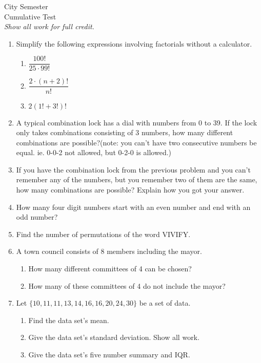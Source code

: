 \documentclass[12pt]{article}
\theoremstyle{plain}     %
\begin{document}
\large
City Semester\\
Cumulative Test\\
\normalsize 
\emph{Show all work for full credit.}
\begin{enumerate}
	\item Simplify the following expressions involving factorials without a calculator.
		\begin{enumerate}
			\item $\dfrac{100!}{25\cdot 99!}$\\[2cm]
			
			\item $\dfrac{2 \cdot (n+2)!}{n!}$\\[2cm]
			\item $2(1!+3!)!$\\[2cm]
			
			
		\end{enumerate}	
		\item A typical combination lock has a dial with numbers from 0 to 39. If the lock only takes combinations consisting of 3 numbers, how many different combinations are possible?(note: you can't have two consecutive numbers be equal. ie. 0-0-2 not allowed, but 0-2-0 is allowed.)\\[2cm]
		\item If you have the combination lock from the previous problem and you can't remember any of the numbers, but you remember two of them are the same, how many combinations are possible? Explain how you got your answer.
		\newpage
		\item How many four digit numbers start with an even number and end with an odd number?\\[2cm]
		\item Find the number of permutations of the word VIVIFY.\\[1.5cm]
		\item A town council consists of 8 members including the mayor.
			\begin{enumerate}
				\item How many different committees of 4 can be chosen?\\[2cm]
				\item How many of these committees of 4 do not include the mayor?\\[2cm]
			\end{enumerate}
		\item Let $\{10,11,11,13,14,16,16,20,24,30\}$ be a set of data.
			\begin{enumerate}
				\item Find the data set's mean.\\[2cm]
				\item Give the data set's standard deviation. Show all work.\\
				\newpage
				\item Give the data set's five number summary and IQR.\\[4cm]
			

\end{enumerate}
\end{enumerate}
\end{document}
